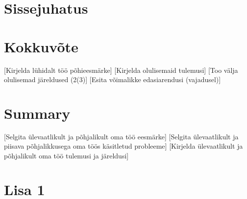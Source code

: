 \documentclass[a4paper, titlepage, 12pt]{article}
\begin{document}


\begin{abstract}
[Here you should briefly describe the aims of your work]
[Here you should briefly describe the main problems dealt with]
[Here you should briefly describe the main results obtained]

The thesis is in [language] and contains [pages] pages of text, [chapters]
chapters, [figures] figures, [tables] tables., etc.
\end{abstract}

\listoffigures
\newpage

\listoftables
\tableofcontents
\newpage

\section*{Sissejuhatus}





\section*{Kokkuvõte}
[Kirjelda lühidalt töö põhieesmärke]
[Kirjelda olulisemaid tulemusi]
[Too välja olulisemad järeldused (2(3)]
[Esita võimalikke edasiarendusi (vajadusel)]

\section*{Summary}
[Selgita ülevaatlikult ja põhjalikult oma töö eesmärke] 
[Selgita ülevaatlikult ja piisava põhjalikkusega oma töös käsitletud probleeme]
[Kirjelda ülevaatlikult ja põhjalikult oma töö tulemusi ja järeldusi]





\section*{Lisa 1}
\end{document}
